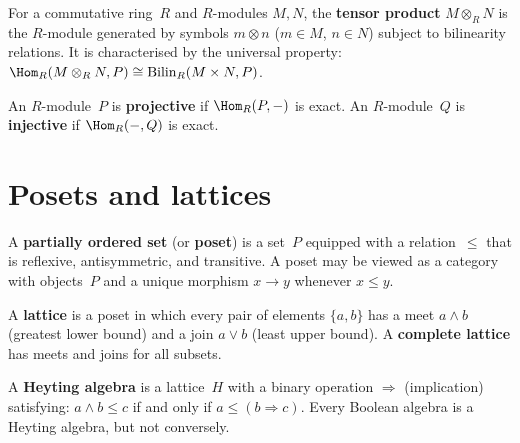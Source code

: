 \begin{definition}\label{def:app-tensor}
For a commutative ring~$R$ and $R$-modules $M,N$, the \textbf{tensor
product} $M\otimes_R N$ is the $R$-module generated by symbols
$m\otimes n$ ($m\in M$, $n\in N$) subject to bilinearity relations.
It is characterised by the universal property:
$\Hom_R(M\otimes_R N, P) \cong \mathrm{Bilin}_R(M\times N, P)$.
\end{definition}

\begin{definition}\label{def:app-proj-inj}
An $R$-module~$P$ is \textbf{projective} if $\Hom_R(P,-)$ is exact.
An $R$-module~$Q$ is \textbf{injective} if $\Hom_R(-,Q)$ is exact.
\end{definition}


\section{Posets and lattices}\label{sec:app-posets}

\begin{definition}\label{def:app-poset}
A \textbf{partially ordered set} (or \textbf{poset}) is a set~$P$
equipped with a relation~$\le$ that is reflexive, antisymmetric, and
transitive.  A poset may be viewed as a category with objects~$P$
and a unique morphism $x\to y$ whenever $x\le y$.
\end{definition}

\begin{definition}[Lattice]\label{def:app-lattice}
A \textbf{lattice} is a poset in which every pair of elements $\{a,b\}$
has a meet $a\wedge b$ (greatest lower bound) and a join $a\vee b$
(least upper bound).  A \textbf{complete lattice} has meets and joins
for all subsets.
\end{definition}

\begin{definition}\label{def:app-heyting}
A \textbf{Heyting algebra} is a lattice~$H$ with a binary operation
$\Rightarrow$ (implication) satisfying: $a\wedge b\le c$ if and only
if $a\le (b\Rightarrow c)$.  Every Boolean algebra is a Heyting algebra,
but not conversely.
\end{definition}



\cleardoublepage
{}
{}
\printindex


